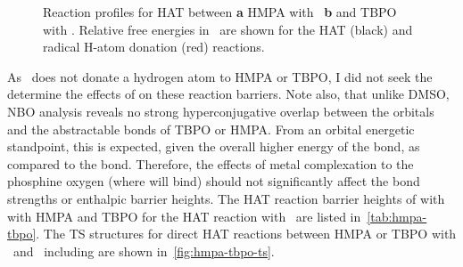 \begin{doublespace}
\begin{figure}[!htbp]
  \caption[Reaction profiles for HAT between HMPA with \bno\, and TBPO with
  \bno.]{Reaction profiles for HAT between \textbf{a} HMPA with \bno\,
  \textbf{b} and TBPO with \bno. Relative free energies in \kcalmol\ are shown
  for the HAT (black) and radical H-atom donation (red) reactions.}
  \label{fig:hmpa-tbpo-bno}
\end{figure}


As \bno\ does not donate a hydrogen atom to HMPA or TBPO, I did not seek the
determine the effects of  on these reaction barriers. Note also, that
unlike DMSO, NBO analysis reveals no strong hyperconjugative overlap between the
 orbitals and the abstractable  bonds of TBPO or HMPA. From an
orbital energetic standpoint, this is expected, given the overall higher energy
of the  bond, as compared to the  bond. Therefore, the effects
of metal complexation to the phosphine oxygen (where  will bind) should
not significantly affect the  bond strengths or enthalpic barrier
heights. The HAT reaction barrier heights of  with with HMPA and TBPO
for the HAT reaction with \cumo\ are listed in~\ref{tab:hmpa-tbpo}. The TS
structures for direct HAT reactions between HMPA or TBPO with \cumo\ and \bno\
including  are shown in~\ref{fig:hmpa-tbpo-ts}.



\end{doublespace}
